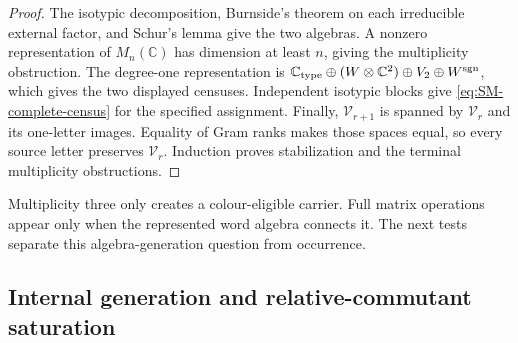 \documentclass[11pt]{article}
\numberwithin{equation}{section}
\theoremstyle{definition}
\theoremstyle{remark}
\newcommand{\C}{\mathbb C}
\begin{document}
\begin{proof}
The isotypic decomposition, Burnside's theorem on each irreducible external
factor, and Schur's lemma give the two algebras.  A nonzero representation of
$M_n(\C)$ has dimension at least $n$, giving the multiplicity obstruction.
The degree-one representation is
$\C_{\rm type}\oplus(W\otimes\C^2)\oplus V_2\oplus W^{\rm sgn}$,
which gives the two displayed censuses.  Independent isotypic blocks give
\eqref{eq:SM-complete-census} for the specified assignment.
Finally, $\mathcal V_{r+1}$ is spanned by $\mathcal V_r$ and its one-letter
images.  Equality of Gram ranks makes those spaces equal, so every source
letter preserves $\mathcal V_r$.  Induction proves stabilization and the
terminal multiplicity obstructions.
\end{proof}

Multiplicity three only creates a colour-eligible carrier.  Full matrix
operations appear only when the represented word algebra connects it.
The next tests separate this algebra-generation question from occurrence.


\subsection{Internal generation and relative-commutant saturation}
\label{sec:internal-landing}
\end{document}
